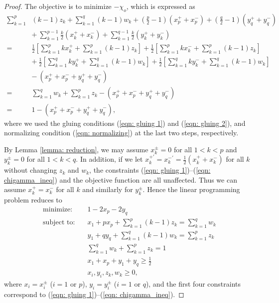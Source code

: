 \documentclass{amsart}
\theoremstyle{definition}
\numberwithin{equation}{section}
\theoremstyle{theorem}
\theoremstyle{remark}
\begin{document}
\begin{proof}
		The objective is to minimize $-\chi_o$, which is expressed as
		\begin{align*}
			\sum_{k=1}^p& (k-1) z_k+\sum_{k=1}^q (k-1) w_k +\left(\frac{p}{2}-1\right)(x_p^+ + x_p^-)+\left(\frac{q}{2}-1\right)(y_q^+ + y_q^-)\\
			&+\ \sum_{k=1}^{p-1} \frac{k}{2}(x_k^+ + x_k^-)+\sum_{k=1}^{q-1} \frac{k}{2} (y_k^+ + y_k^-)\\
			=\ & \frac{1}{2}\left[\sum_{k=1}^p k x_k^+ + \sum_{k=1}^p (k-1) z_k\right] +\frac{1}{2}\left[\sum_{k=1}^p k x_k^- + \sum_{k=1}^p (k-1) z_k\right]\\
			& +\ \frac{1}{2}\left[\sum_{k=1}^q k y_k^+ + \sum_{k=1}^q (k-1) w_k\right] +\frac{1}{2}\left[\sum_{k=1}^q k y_k^- + \sum_{k=1}^q (k-1) w_k\right]\\
			&-\ (x_p^+ + x_p^- + y_q^+ + y_q^-)\\
			=\ & \sum_{k=1}^q w_k+\sum_{k=1}^p z_k-(x_p^+ + x_p^- + y_q^+ + y_q^-)\\
			=\ & 1-(x_p^+ + x_p^- + y_q^+ + y_q^-),
		\end{align*}
		where we used the gluing conditions (\ref{eqn: gluing 1}) and (\ref{eqn: gluing 2}), and normalizing condition (\ref{eqn: normalizing}) at the last two steps, respectively.
		
		By Lemma \ref{lemma: reduction}, we may assume $x_k^\pm=0$ for all $1<k<p$ and $y_k^\pm=0$ for all $1<k<q$. 
		In addition, if we let $x_k^{+\prime}=x_k^{-\prime}=\frac{1}{2}(x_k^+ + x_k^-)$ for all $k$ without changing $z_k$ and $w_k$, the constraints (\ref{eqn: gluing 1})--(\ref{eqn: chigamma_ineq}) and the objective function are all unaffected.
		Thus we can assume $x_k^+=x_k^-$ for all $k$ and similarly for $y_k^\pm$.
		Hence the linear programming problem reduces to
		\begin{align*}
			\text{minimize:}\quad     &1-2x_p - 2y_q\\
			\text{subject to:}\quad    &x_1 + p x_p + \sum_{k=1}^p (k-1)z_k = \sum_{k=1}^q w_k\\
			&y_1 + q y_q + \sum_{k=1}^q (k-1)w_k = \sum_{k=1}^p z_k\\
			&\sum_{k=1}^q w_k+\sum_{k=1}^p z_k=1\\
			&x_1 + x_p + y_1 + y_q \ge \frac{1}{2}\\
			&x_i,y_i,z_k,w_k\ge0,
		\end{align*}
		where $x_i=x_i^\pm$ ($i=1$ or $p$), $y_i=y_i^\pm$ ($i=1$ or $q$), and the first four constraints correspond to (\ref{eqn: gluing 1})--(\ref{eqn: chigamma_ineq}).
		

\end{proof}
\end{document}

